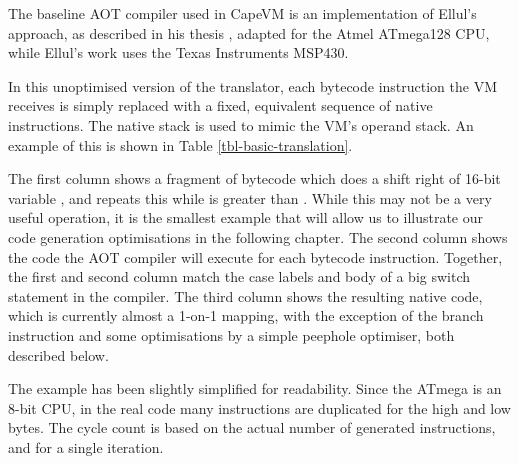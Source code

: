 The baseline AOT compiler used in CapeVM is an implementation of Ellul's approach, as described in his thesis \cite{Ellul:2012thesis}, adapted for the Atmel ATmega128 CPU, while Ellul's work uses the Texas Instruments MSP430. 

In this unoptimised version of the translator, each bytecode instruction the VM receives is simply replaced with a fixed, equivalent sequence of native instructions. The native stack is used to mimic the VM's operand stack. An example of this is shown in Table \ref{tbl-basic-translation}.

The first column shows a fragment of bytecode which does a shift right of 16-bit variable , and repeats this while  is greater than . While this may not be a very useful operation, it is the smallest example that will allow us to illustrate our code generation optimisations in the following chapter. The second column shows the code the AOT compiler will execute for each bytecode instruction. Together, the first and second column match the case labels and body of a big switch statement in the compiler. The third column shows the resulting native code, which is currently almost a 1-on-1 mapping, with the exception of the branch instruction and some optimisations by a simple peephole optimiser, both described below.

The example has been slightly simplified for readability. Since the ATmega is an 8-bit CPU, in the real code many instructions are duplicated for the high and low bytes. The cycle count is based on the actual number of generated instructions, and for a single iteration.


